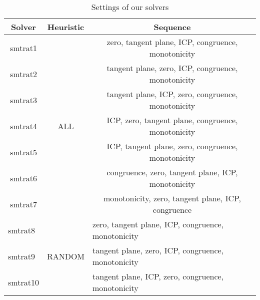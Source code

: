 \begin{table}[]
    \centering
    \caption{Settings of our solvers}
    \begin{tabular}{|c|c|c|}
    \hline
    \textbf{Solver}                & \textbf{Heuristic}                           & \textbf{Sequence}                                                       \\ \hline
    smtrat1                        & \multirow{7}{*}{ALL}                         & zero, tangent plane, ICP, congruence, monotonicity                      \\ \cline{1-1} \cline{3-3} 
    smtrat2                        &                                              & tangent plane, zero, ICP, congruence, monotonicity                      \\ \cline{1-1} \cline{3-3} 
    smtrat3                        &                                              & tangent plane, ICP, zero, congruence, monotonicity                      \\ \cline{1-1} \cline{3-3} 
    smtrat4                        &                                              & ICP, zero, tangent plane, congruence, monotonicity                      \\ \cline{1-1} \cline{3-3} 
    smtrat5                        &                                              & ICP, tangent plane, zero, congruence, monotonicity                      \\ \cline{1-1} \cline{3-3} 
    smtrat6                        &                                              & congruence, zero, tangent plane, ICP, monotonicity                      \\ \cline{1-1} \cline{3-3} 
    smtrat7                        &                                              & monotonicity, zero, tangent plane, ICP, congruence                      \\ \hline
    \multicolumn{1}{|l|}{smtrat8}  & \multicolumn{1}{l|}{\multirow{7}{*}{RANDOM}} & \multicolumn{1}{l|}{zero, tangent plane, ICP, congruence, monotonicity} \\ \cline{1-1} \cline{3-3} 
    \multicolumn{1}{|l|}{smtrat9}  & \multicolumn{1}{l|}{}                        & \multicolumn{1}{l|}{tangent plane, zero, ICP, congruence, monotonicity} \\ \cline{1-1} \cline{3-3} 
    \multicolumn{1}{|l|}{smtrat10} & \multicolumn{1}{l|}{}                        & \multicolumn{1}{l|}{tangent plane, ICP, zero, congruence, monotonicity} \\ \cline{1-1} \cline{3-3} 

\end{tabular}
\end{table}
